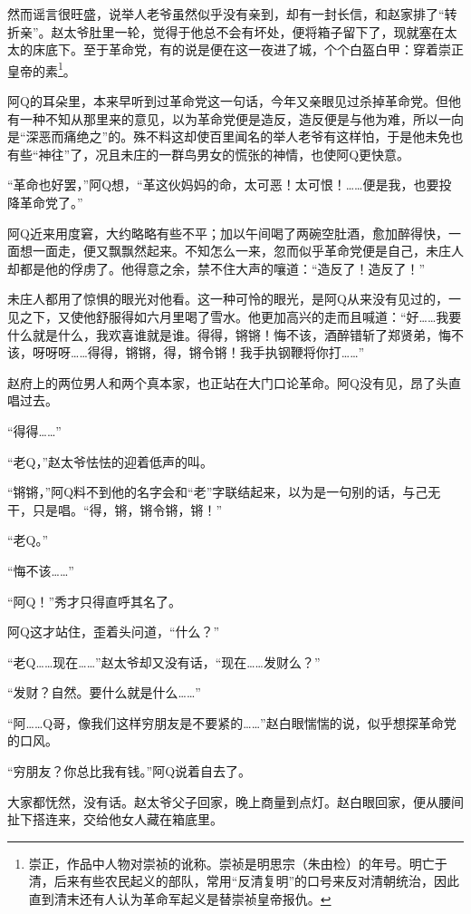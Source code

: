 \documentclass[12pt,UTF8]{ctexbook}
\begin{document}
然而谣言很旺盛，说举人老爷虽然似乎没有亲到，却有一封长信，和赵家排了“转折亲”。赵太爷肚里一轮，觉得于他总不会有坏处，便将箱子留下了，现就塞在太太的床底下。至于革命党，有的说是便在这一夜进了城，个个白盔白甲：穿着崇正皇帝的素\footnote{崇正，作品中人物对崇祯的讹称。崇祯是明思宗（朱由检）的年号。明亡于清，后来有些农民起义的部队，常用“反清复明”的口号来反对清朝统治，因此直到清末还有人认为革命军起义是替崇祯皇帝报仇。}。

阿Q的耳朵里，本来早听到过革命党这一句话，今年又亲眼见过杀掉革命党。但他有一种不知从那里来的意见，以为革命党便是造反，造反便是与他为难，所以一向是“深恶而痛绝之”的。殊不料这却使百里闻名的举人老爷有这样怕，于是他未免也有些“神往”了，况且未庄的一群鸟男女的慌张的神情，也使阿Q更快意。

“革命也好罢，”阿Q想，“革这伙妈妈的命，太可恶！太可恨！……便是我，也要投降革命党了。”

阿Q近来用度窘，大约略略有些不平；加以午间喝了两碗空肚酒，愈加醉得快，一面想一面走，便又飘飘然起来。不知怎么一来，忽而似乎革命党便是自己，未庄人却都是他的俘虏了。他得意之余，禁不住大声的嚷道：“造反了！造反了！”

未庄人都用了惊惧的眼光对他看。这一种可怜的眼光，是阿Q从来没有见过的，一见之下，又使他舒服得如六月里喝了雪水。他更加高兴的走而且喊道：“好……我要什么就是什么，我欢喜谁就是谁。得得，锵锵！悔不该，酒醉错斩了郑贤弟，悔不该，呀呀呀……得得，锵锵，得，锵令锵！我手执钢鞭将你打……”

赵府上的两位男人和两个真本家，也正站在大门口论革命。阿Q没有见，昂了头直唱过去。

“得得……”

“老Q，”赵太爷怯怯的迎着低声的叫。

“锵锵，”阿Q料不到他的名字会和“老”字联结起来，以为是一句别的话，与己无干，只是唱。“得，锵，锵令锵，锵！”

“老Q。”

“悔不该……”

“阿Q！”秀才只得直呼其名了。

阿Q这才站住，歪着头问道，“什么？”

“老Q……现在……”赵太爷却又没有话，“现在……发财么？”

“发财？自然。要什么就是什么……”

“阿……Q哥，像我们这样穷朋友是不要紧的……”赵白眼惴惴的说，似乎想探革命党的口风。

“穷朋友？你总比我有钱。”阿Q说着自去了。

大家都怃然，没有话。赵太爷父子回家，晚上商量到点灯。赵白眼回家，便从腰间扯下搭连来，交给他女人藏在箱底里。
\end{document}
